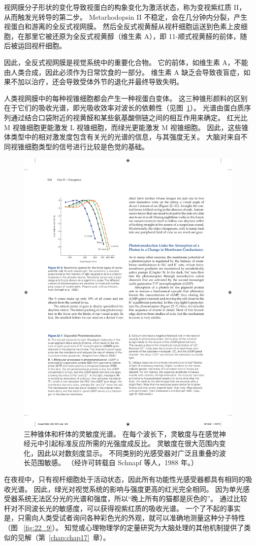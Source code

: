 视网膜分子形状的变化导致视蛋白的构象变化为激活状态，称为变视紫红质 II，从而触发光转导的第二步。
Metarhodopsin II 不稳定，会在几分钟内分裂，产生视蛋白和游离的全反式视网膜。
然后全反式视黄醛从视杆细胞运送到色素上皮细胞，在那里它被还原为全反式视黄醇（维生素 A），即 11-顺式视黄醛的前体，随后被运回视杆细胞。


因此，全反式视网膜是视觉系统中的重要化合物。
它的前体，如维生素 A，不能由人类合成，因此必须作为日常饮食的一部分。
维生素 A 缺乏会导致夜盲症，如果不加以治疗，还会导致受体外节的退化并最终导致失明。


人类视网膜中的每种视锥细胞都会产生一种视蛋白变体。 
这三种锥形颜料的区别在于它们的吸收光谱，即光吸收效率对波长的依赖性（见图~\ref{fig:22_6}）。
光谱由蛋白质序列通过结合口袋附近的视黄醛和某些氨基酸侧链之间的相互作用来确定。
红光比 M 视锥细胞更能激发 L 视锥细胞，而绿光更能激发 M 视锥细胞。
因此，这些锥体类型中的相对激发度包含有关光的光谱的信息，与其强度无关。
大脑对来自不同视锥细胞类型的信号进行比较是色觉的基础。


\begin{figure}[htbp]
	\centering
	\includegraphics[width=0.5\linewidth]{chap22/fig_22_6}
	\caption{三种锥体和杆体的灵敏度光谱。 
		在每个波长下，灵敏度与在感觉神经元中引起标准反应所需的光强度成反比。 
		灵敏度在很大范围内变化，因此以对数刻度显示。 
		不同类别的光感受器对广泛且重叠的波长范围敏感。 （经许可转载自 Schnapf 等人，1988 年。）}
	\label{fig:22_6}
\end{figure}


在夜视中，只有视杆细胞处于活动状态，因此所有功能性光感受器都具有相同的吸收光谱。
因此，绿光对视觉系统的影响与强度更高的红光完全相同。
因为单光感受器系统无法区分光的光谱和强度，所以“晚上所有的猫都是灰色的”。
通过比较杆对不同波长光的敏感度，可以获得视紫红质的吸收光谱。
一个了不起的事实是，只需向人类受试者询问各种彩色光的外观，就可以准确地测量这种分子特性（图 ~\ref{fig:22_9}）。
知觉或心理物理学的定量研究为大脑处理的其他机制提供了类似的见解（第~\ref{chap:chap17}~章）。


